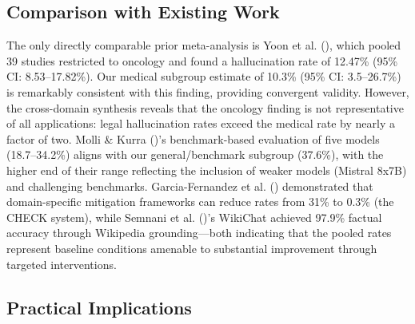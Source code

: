\documentclass[
  11pt,
  a4paper,
]{article}
\begin{document}
\subsection{Comparison with Existing
Work}\label{comparison-with-existing-work}

The only directly comparable prior meta-analysis is Yoon et al.
(), which pooled 39 studies restricted to
oncology and found a hallucination rate of 12.47\% (95\% CI:
8.53--17.82\%). Our medical subgroup estimate of 10.3\% (95\% CI:
3.5--26.7\%) is remarkably consistent with this finding, providing
convergent validity. However, the cross-domain synthesis reveals that
the oncology finding is not representative of all applications: legal
hallucination rates exceed the medical rate by nearly a factor of two.
Molli \& Kurra ()'s benchmark-based
evaluation of five models (18.7--34.2\%) aligns with our
general/benchmark subgroup (37.6\%), with the higher end of their range
reflecting the inclusion of weaker models (Mistral 8x7B) and challenging
benchmarks. Garcia-Fernandez et al. ()
demonstrated that domain-specific mitigation frameworks can reduce rates
from 31\% to 0.3\% (the CHECK system), while Semnani et al.
()'s WikiChat achieved 97.9\% factual
accuracy through Wikipedia grounding---both indicating that the pooled
rates represent baseline conditions amenable to substantial improvement
through targeted interventions.

\subsection{Practical Implications}\label{practical-implications}
\end{document}
